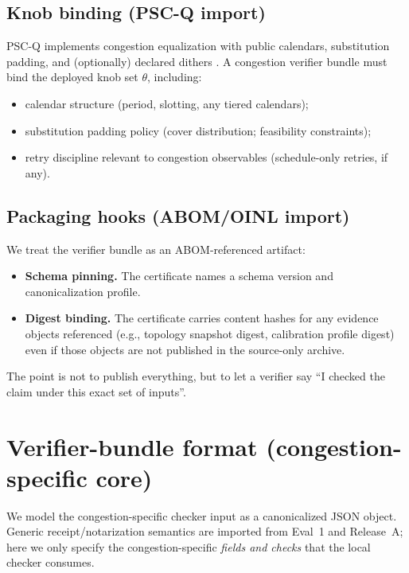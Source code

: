 \documentclass[11pt]{article}
\begin{document}
\subsection{Knob binding (PSC-Q import)}
PSC-Q implements congestion equalization with public calendars, substitution padding, and (optionally) declared dithers \cite{series:pscq}.
A congestion verifier bundle must bind the deployed knob set $\theta$, including:
\begin{itemize}[leftmargin=1.2em]
\item calendar structure (period, slotting, any tiered calendars);
\item substitution padding policy (cover distribution; feasibility constraints);
\item retry discipline relevant to congestion observables (schedule-only retries, if any).
\end{itemize}

\subsection{Packaging hooks (ABOM/OINL import)}
We treat the verifier bundle as an ABOM-referenced artifact:
\begin{itemize}[leftmargin=1.2em]
\item \textbf{Schema pinning.} The certificate names a schema version and canonicalization profile.
\item \textbf{Digest binding.} The certificate carries content hashes for any evidence objects referenced (e.g., topology snapshot digest, calibration profile digest) even if those objects are not published in the source-only archive.
\end{itemize}
The point is not to publish everything, but to let a verifier say ``I checked the claim under this exact set of inputs''.

\section{Verifier-bundle format (congestion-specific core)}
We model the congestion-specific checker input as a canonicalized JSON object.
Generic receipt/notarization semantics are imported from Eval~1 and Release~A; here we only specify the congestion-specific \emph{fields and checks} that the local checker consumes.\cite{series:evalnotary,series:release}
\end{document}

